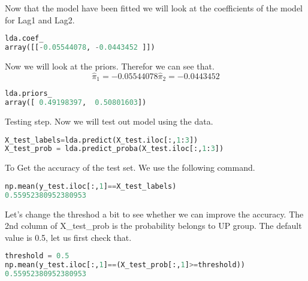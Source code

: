 Now that the model have been fitted we will look at the coefficients of the model for Lag1 and Lag2.

\begin{lstlisting}[language=Python]
lda.coef_
array([[-0.05544078, -0.0443452 ]])
\end{lstlisting}

Now we will look at the priors. Therefor we can see that. $$ \hat{ \pi }_1 = -0.05544078  \hat{ \pi }_2 = -0.0443452 $$ 
\begin{lstlisting}[language=Python]
lda.priors_
array([ 0.49198397,  0.50801603])
\end{lstlisting}

Testing step. Now we will test out model using the data.
\begin{lstlisting}[language=Python]
X_test_labels=lda.predict(X_test.iloc[:,1:3])
X_test_prob = lda.predict_proba(X_test.iloc[:,1:3])
\end{lstlisting}

To Get the accuracy of the test set. We use the following command.

\begin{lstlisting}[language=Python]
np.mean(y_test.iloc[:,1]==X_test_labels)
0.55952380952380953
\end{lstlisting}

Let's change the threshod a bit to see whether we can improve the accuracy. The 2nd column of X\_test\_prob is the probability belongs to UP group. The default value is 0.5, let us first check that.

\begin{lstlisting}[language=Python]
threshold = 0.5 
np.mean(y_test.iloc[:,1]==(X_test_prob[:,1]>=threshold))
0.55952380952380953
\end{lstlisting}

